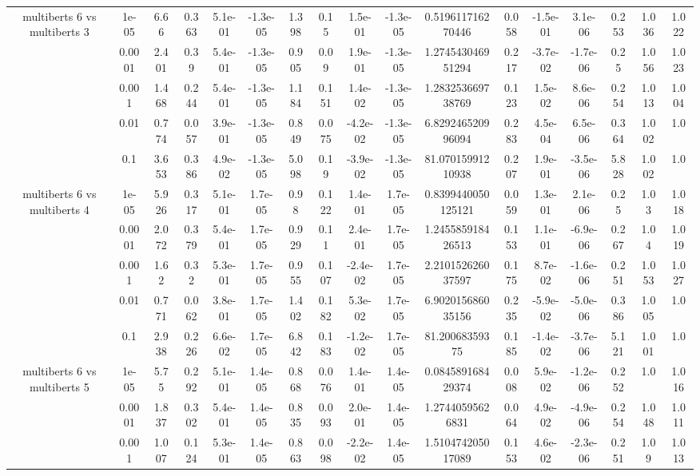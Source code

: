 \begin{tabular}{|c|c|c|c|c|c|c|c|c|c|c|c|c|c|c|c|c|}
\hline
\multirow{5}{*}{multiberts 6 vs multiberts 3} & 1e-05 & 6.66 & 0.363 & 5.1e-01 & -1.3e-05 & 1.398 & 0.15 & 1.5e-01 & -1.3e-05 & 0.519611716270446 & 0.058 & -1.5e-01 & 3.1e-06 & 0.253 & 1.036 & 1.022 \\
 & 0.0001 & 2.401 & 0.39 & 5.4e-01 & -1.3e-05 & 0.905 & 0.09 & 1.9e-01 & -1.3e-05 & 1.274543046951294 & 0.217 & -3.7e-02 & -1.7e-06 & 0.25 & 1.056 & 1.023 \\
 & 0.001 & 1.468 & 0.244 & 5.4e-01 & -1.3e-05 & 1.184 & 0.151 & 1.4e-02 & -1.3e-05 & 1.283253669738769 & 0.123 & 1.5e-02 & 8.6e-06 & 0.254 & 1.013 & 1.004 \\
 & 0.01 & 0.774 & 0.057 & 3.9e-01 & -1.3e-05 & 0.849 & 0.075 & -4.2e-02 & -1.3e-05 & 6.829246520996094 & 0.283 & 4.5e-04 & 6.5e-06 & 0.364 & 1.002 & 1.0 \\
 & 0.1 & 3.653 & 0.386 & 4.9e-02 & -1.3e-05 & 5.098 & 0.19 & -3.9e-02 & -1.3e-05 & 81.07015991210938 & 0.207 & 1.9e-01 & -3.5e-06 & 5.828 & 1.002 & 1.0 \\
\hline
\multirow{5}{*}{multiberts 6 vs multiberts 4} & 1e-05 & 5.926 & 0.317 & 5.1e-01 & 1.7e-05 & 0.98 & 0.122 & 1.4e-01 & 1.7e-05 & 0.8399440050125121 & 0.059 & 1.3e-01 & 2.1e-06 & 0.25 & 1.03 & 1.018 \\
 & 0.0001 & 2.072 & 0.379 & 5.4e-01 & 1.7e-05 & 0.929 & 0.11 & 2.4e-01 & 1.7e-05 & 1.245585918426513 & 0.153 & 1.1e-01 & -6.9e-06 & 0.267 & 1.04 & 1.019 \\
 & 0.001 & 1.62 & 0.32 & 5.3e-01 & 1.7e-05 & 0.955 & 0.107 & -2.4e-02 & 1.7e-05 & 2.210152626037597 & 0.175 & 8.7e-02 & -1.6e-06 & 0.251 & 1.053 & 1.027 \\
 & 0.01 & 0.771 & 0.062 & 3.8e-01 & 1.7e-05 & 1.402 & 0.182 & 5.3e-02 & 1.7e-05 & 6.902015686035156 & 0.235 & -5.9e-02 & -5.0e-06 & 0.386 & 1.005 & 1.0 \\
 & 0.1 & 2.938 & 0.226 & 6.6e-02 & 1.7e-05 & 6.842 & 0.183 & -1.2e-02 & 1.7e-05 & 81.20068359375 & 0.185 & -1.4e-02 & -3.7e-06 & 5.121 & 1.001 & 1.0 \\
\hline
\multirow{5}{*}{multiberts 6 vs multiberts 5} & 1e-05 & 5.75 & 0.292 & 5.1e-01 & 1.4e-05 & 0.868 & 0.076 & 1.4e-01 & 1.4e-05 & 0.084589168429374 & 0.008 & 5.9e-02 & -1.2e-06 & 0.252 & 1.0 & 1.016 \\
 & 0.0001 & 1.837 & 0.302 & 5.4e-01 & 1.4e-05 & 0.835 & 0.093 & 2.0e-01 & 1.4e-05 & 1.27440595626831 & 0.064 & 4.9e-02 & -4.9e-06 & 0.254 & 1.048 & 1.011 \\
 & 0.001 & 1.007 & 0.124 & 5.3e-01 & 1.4e-05 & 0.863 & 0.098 & -2.2e-02 & 1.4e-05 & 1.510474205017089 & 0.153 & 4.6e-02 & -2.3e-06 & 0.251 & 1.09 & 1.013 \\

\end{tabular}
